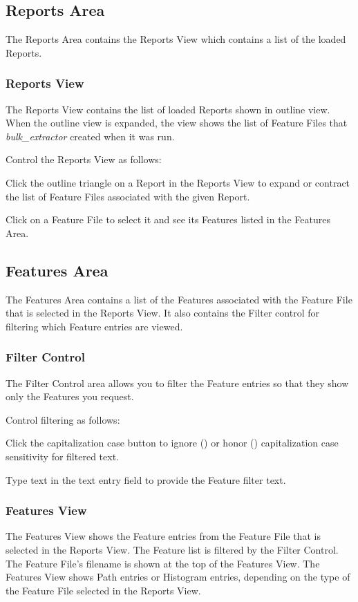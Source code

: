 \documentclass[10pt,twoside]{article}
\newcommand{\bulk}{\emph{bulk\_extractor}\xspace}
\newcommand{\button}[1]{(\raisebox{-1.20mm}{\texttt{[image: ./graphics/\#1]}})}
\begin{document}
\subsection{Reports Area}
The Reports Area contains the Reports View which contains a list of the loaded Reports.

\subsubsection{Reports View}
The Reports View contains the list of loaded Reports shown in outline view.
When the outline view is expanded, the view shows the list of Feature Files
that \bulk created when it was run.

Control the Reports View as follows:
\begin{compactitem}
\item Click the outline triangle on a Report in the Reports View to expand or contract
the list of Feature Files associated with the given Report.
\item Click on a Feature File to select it and see its Features listed in the Features Area.
\end{compactitem}

\subsection{Features Area}
The Features Area contains a list of the Features associated with the Feature File
that is selected in the Reports View.
It also contains the \gls{Filter} control for filtering which Feature entries are viewed.

\subsubsection{Filter Control}
The Filter Control area allows you to filter the Feature entries
so that they show only the Features you request.

Control filtering as follows:
\begin{compactitem}
\item Click the capitalization case button to ignore \button{CaseInsensitive}
or honor \button{CaseSensitive} capitalization case sensitivity for filtered text.
\item Type text in the text entry field to provide the Feature filter text.
\end{compactitem}

\subsubsection{Features View}
The Features View shows the Feature entries from the Feature File
that is selected in the Reports View.
The Feature list is filtered by the Filter Control.
The Feature File's filename is shown at the top of the Features View.
The Features View shows \gls{Path} entries or \gls{Histogram} entries,
depending on the type of the Feature File selected in the Reports View.
\end{document}
